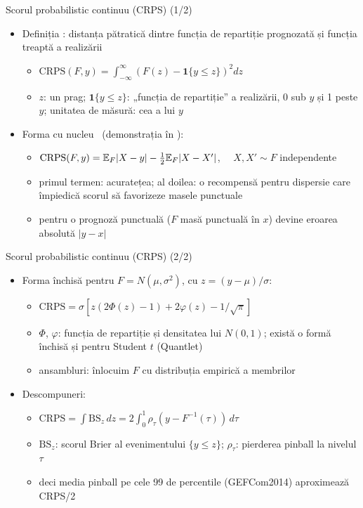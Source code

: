 \begin{frame}{Scorul probabilistic continuu (CRPS) (1/2)}
\itemsize{\small}
\begin{itemize}
    \item Definiția : distanța pătratică dintre funcția de repartiție prognozată și funcția treaptă a realizării
    \begin{itemize}
        \item $\mathrm{CRPS}(F, y) = \int_{-\infty}^{\infty}(F(z) - \mathbf 1\{y \le z\})^2dz$
        \item $z$: un prag; $\mathbf 1\{y \le z\}$: „funcția de repartiție” a realizării, 0 sub $y$ și 1 peste $y$; unitatea de măsură: cea a lui $y$
    \end{itemize}
    \item Forma cu nucleu \ (demonstrația în ):
    \begin{itemize}
        \item $\mathrm{CRPS}(F, y) = \mathbb{E}_F|X - y| - \frac12\mathbb{E}_F|X - X'|$, $\quad X, X' \sim F$ independente
        \item primul termen: acuratețea; al doilea: o recompensă pentru dispersie care împiedică scorul să favorizeze masele punctuale
        \item pentru o prognoză punctuală ($F$ masă punctuală în $x$) devine eroarea absolută $|y - x|$
    \end{itemize}
\end{itemize}
\end{frame}

\begin{frame}{Scorul probabilistic continuu (CRPS) (2/2)}
\itemsize{\small}
\begin{itemize}
    \item Forma închisă pentru $F = N(\mu, \sigma^2)$, cu $z = (y - \mu)/\sigma$:
    \begin{itemize}
        \item $\mathrm{CRPS} = \sigma\left[z(2\Phi(z) - 1) + 2\varphi(z) - 1/\sqrt\pi\right]$
        \item $\Phi$, $\varphi$: funcția de repartiție și densitatea lui $N(0,1)$; există o formă închisă și pentru Student $t$ (Quantlet)
        \item ansambluri: înlocuim $F$ cu distribuția empirică a membrilor
    \end{itemize}
    \item Descompuneri:
    \begin{itemize}
        \item $\mathrm{CRPS} = \int \mathrm{BS}_z\,dz = 2\int_0^1 \rho_\tau(y - F^{-1}(\tau))\,d\tau$
        \item $\mathrm{BS}_z$: scorul Brier al evenimentului $\{y \le z\}$; $\rho_\tau$: pierderea pinball la nivelul $\tau$
        \item deci media pinball pe cele 99 de percentile (GEFCom2014) aproximează CRPS/2 
    \end{itemize}
\end{itemize}
\end{frame}

